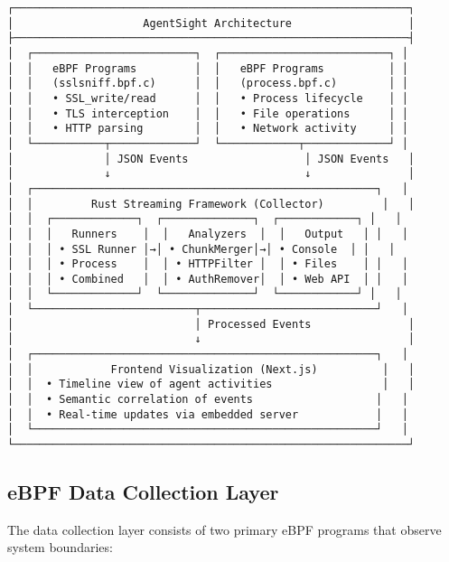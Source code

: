 \documentclass[sigplan,screen，review,9pt]{acmart}
\begin{document}
\begin{center}
\begin{Verbatim}[fontsize=\footnotesize, commandchars=\\\{\}]
┌─────────────────────────────────────────────────────────────┐
│                    AgentSight Architecture                  │
├─────────────────────────────────────────────────────────────┤
│  ┌─────────────────────────┐  ┌──────────────────────────┐ │
│  │   eBPF Programs         │  │   eBPF Programs          │ │
│  │   (sslsniff.bpf.c)      │  │   (process.bpf.c)        │ │
│  │   • SSL_write/read      │  │   • Process lifecycle    │ │
│  │   • TLS interception    │  │   • File operations      │ │
│  │   • HTTP parsing        │  │   • Network activity     │ │
│  └───────────┬─────────────┘  └────────────┬─────────────┘ │
│              │ JSON Events                  │ JSON Events   │
│              ↓                              ↓               │
│  ┌─────────────────────────────────────────────────────┐   │
│  │         Rust Streaming Framework (Collector)         │   │
│  │  ┌─────────────┐  ┌──────────────┐  ┌────────────┐ │   │
│  │  │   Runners    │  │   Analyzers  │  │   Output   │ │   │
│  │  │ • SSL Runner │→│ • ChunkMerger│→│ • Console  │ │   │
│  │  │ • Process    │  │ • HTTPFilter │  │ • Files    │ │   │
│  │  │ • Combined   │  │ • AuthRemover│  │ • Web API  │ │   │
│  │  └─────────────┘  └──────────────┘  └────────────┘ │   │
│  └─────────────────────────┬───────────────────────────┘   │
│                            │ Processed Events               │
│                            ↓                                │
│  ┌─────────────────────────────────────────────────────┐   │
│  │            Frontend Visualization (Next.js)          │   │
│  │  • Timeline view of agent activities                 │   │
│  │  • Semantic correlation of events                   │   │
│  │  • Real-time updates via embedded server            │   │
│  └─────────────────────────────────────────────────────┘   │
└─────────────────────────────────────────────────────────────┘
\end{Verbatim}
\end{center}

\subsection{eBPF Data Collection Layer}

The data collection layer consists of two primary eBPF programs that observe system boundaries:
\end{document}
